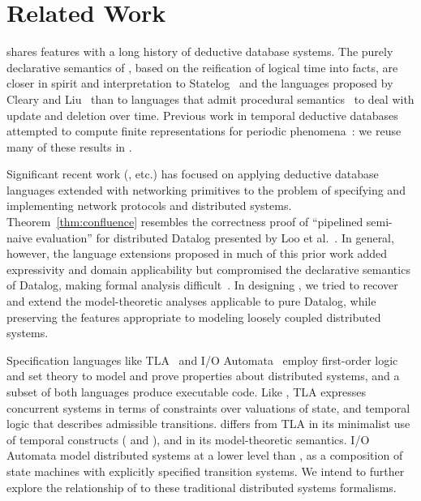 \section{Related Work}
\label{sec:relwork}

\lang shares features with a long history of deductive database systems.
The purely declarative semantics of \lang, based on the reification of logical time into
facts, are closer in spirit and interpretation to  Statelog~\cite{statelog} and
the languages proposed by Cleary and Liu~\cite{harmful,deductiveupdates,starlog} than
to languages that admit procedural semantics~\cite{ldl, glue-nail} to deal with update 
and deletion over time.
Previous work in temporal deductive databases attempted to compute finite representations for periodic phenomena~\cite{tdd-infinite}: we reuse many of these results in \lang.

Significant recent work (\cite{boom,Belaramani:2009,Chu:2007,Loo2009-CACM}, etc.) has focused on applying deductive database languages extended with networking 
primitives to the problem of specifying and implementing network protocols and distributed systems.  Theorem~\ref{thm:confluence} resembles the  correctness proof of ``pipelined
semi-naive evaluation'' for distributed Datalog presented by Loo et al.~\cite{loo-sigmod06}.
In general, however, the language extensions 
proposed in much of this prior work added
expressivity and domain applicability but compromised the declarative
semantics of Datalog, making formal analysis difficult~\cite{Mao2009, navarro-oper-sem}.
In designing \lang, we tried to recover and extend the model-theoretic analyses applicable
to pure Datalog, while preserving the features appropriate to modeling loosely coupled
distributed systems.

Specification languages like TLA~\cite{tla} and I/O Automata~\cite{ioa} employ
first-order logic and set theory to model and prove properties about distributed
systems, and a subset of both languages produce executable code.  Like \lang,
TLA expresses concurrent systems in terms of constraints over valuations of
state, and temporal logic that describes admissible transitions.  \lang differs
from TLA in its minimalist use of temporal constructs ( and
), and in its model-theoretic semantics.  I/O Automata model
distributed systems at a lower level than \lang, as a composition of state
machines with explicitly specified transition systems.  We intend to further
explore the relationship of \lang to these traditional distributed systems
formalisms.

